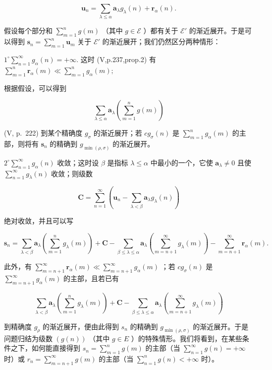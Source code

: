 \[
\mathbf {u} _ {n} = \sum_ {\lambda \leqslant \alpha} \mathbf {a} _ {\lambda} g _ {\lambda} (n) + \mathbf {r} _ {\alpha} (n).
\]

假设每个部分和 \(\sum_{m=1}^{n} g(m)\) （其中 \(g \in \mathcal{E}\) ）都有关于 \(\mathcal{E}'\) 的渐近展开。于是可以得到 \(\mathbf{s}_n = \sum_{m=1}^{n} \mathbf{u}_m\) 关于 \(\mathcal{E}'\) 的渐近展开；我们仍然区分两种情形：

\(1^{\circ}\sum_{n = 1}^{\infty}g_{\alpha}(n) = +\infty .\) 这时 (V,p.237,prop.2) 有 \(\sum_{m = 1}^{n}\mathbf{r}_{\alpha}(m)\ll \sum_{m = 1}^{n}g_{\alpha}(m);\)

根据假设，可以得到

\[
\sum_ {\lambda \leqslant \alpha} \mathbf {a} _ {\lambda} \left(\sum_ {m = 1} ^ {n} g (m)\right)
\]

(V, p.~222) 到某个精确度 \(g_{\sigma}\) 的渐近展开；若 \(cg_{\sigma}(n)\) 是 \(\sum_{m=1}^{n} g_{\alpha}(m)\) 的主部，则将有 \(\mathbf{s}_n\) 的精确到 \(g_{\min(\rho, \sigma)}\) 的渐近展开。

\(2^{\circ}\sum_{n = 1}^{\infty}g_{\alpha}(n)\) 收敛；这时设 \(\beta\) 是指标 \(\lambda \leqslant \alpha\) 中最小的一个，它使 \(\mathbf{a}_{\lambda}\neq 0\) 且使 \(\sum_{n = 1}^{\infty}g_{\lambda}(n)\) 收敛；则级数

\[
\mathbf {C} = \sum_ {n = 1} ^ {\infty} \left(\mathbf {u} _ {n} - \sum_ {\lambda <   \beta} \mathbf {a} _ {\lambda} g _ {\lambda} (n)\right)
\]

绝对收敛，并且可以写

\[
\mathbf {s} _ {n} = \sum_ {\lambda <   \beta} \mathbf {a} _ {\lambda} \left(\sum_ {m = 1} ^ {n} g _ {\lambda} (m)\right) + \mathbf {C} - \sum_ {\beta \leqslant \lambda \leqslant \alpha} \mathbf {a} _ {\lambda} \left(\sum_ {m = n + 1} ^ {\infty} g _ {\lambda} (m)\right) - \sum_ {m = n + 1} ^ {\infty} \mathbf {r} _ {\alpha} (m).
\]

此外，有 \(\sum_{m=n+1}^{\infty}\mathbf{r}_{\alpha}(m)\ll\sum_{m=n+1}^{\infty}g_{\alpha}(m)\) ；若 \(cg_{\sigma}(n)\) 是 \(\sum_{m=n+1}^{\infty}g_{\alpha}(m)\) 的主部，且若已有

\[
\sum_ {\lambda <   \beta} \mathbf {a} _ {\lambda} \left(\sum_ {m = 1} ^ {n} g _ {\lambda} (m)\right) + \mathbf {C} - \sum_ {\beta \leqslant \lambda \leqslant \alpha} \mathbf {a} _ {\lambda} \left(\sum_ {m = n + 1} ^ {\infty} g _ {\lambda} (m)\right)
\]

到精确度 \(g_{\rho}\) 的渐近展开，便由此得到 \(s_{n}\) 的精确到 \(g_{\min(\rho,\sigma)}\) 的渐近展开。于是问题归结为级数 \((g(n))\) （其中 \(g \in E\) ）的特殊情形。我们将看到，在某些条件之下，如何能直接得到 \(s_{n} = \sum_{m=1}^{n} g(m)\) 的主部（当 \(\sum_{n=1}^{\infty} g(n) = +\infty\) 时）或 \(r_{n} = \sum_{m=n+1}^{\infty} g(m)\) 的主部（当 \(\sum_{n=1}^{n} g(n) < +\infty\) 时）。

